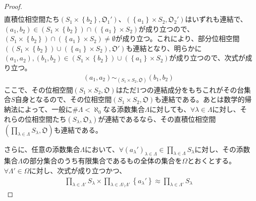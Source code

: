\documentclass[dvipdfmx]{jsarticle}
\begin{document}
\begin{proof}
\begin{align*}
\end{align*}
直積位相空間たち$\left( S_{1} \times \left\{ b_{2} \right\},\mathfrak{O}_{1}' \right)$、$\left( \left\{ a_{1} \right\} \times S_{2},\mathfrak{O}_{2}' \right)$はいずれも連結で、$\left( a_{1},b_{2} \right) \in \left( S_{1} \times \left\{ b_{2} \right\} \right) \cap \left( \left\{ a_{1} \right\} \times S_{2} \right)$が成り立つので、$\left( S_{1} \times \left\{ b_{2} \right\} \right) \cap \left( \left\{ a_{1} \right\} \times S_{2} \right) \neq \emptyset$が成り立つ。これにより、部分位相空間$\left( \left( S_{1} \times \left\{ b_{2} \right\} \right) \cup \left( \left\{ a_{1} \right\} \times S_{2} \right),\mathfrak{O}' \right)$も連結となり、明らかに$\left( a_{1},a_{2} \right),\left( b_{1},b_{2} \right) \in \left( S_{1} \times \left\{ b_{2} \right\} \right) \cup \left( \left\{ a_{1} \right\} \times S_{2} \right)$が成り立つので、次式が成り立つ。
\begin{align*}
\left( a_{1},a_{2} \right) \sim_{\left( S_{1} \times S_{2},\mathfrak{O} \right)}\left( b_{1},b_{2} \right)
\end{align*}
ここで、その位相空間$\left( S_{1} \times S_{2},\mathfrak{O} \right)$はただ1つの連結成分をもちこれがその台集合$S$自身となるので、その位相空間$\left( S_{1} \times S_{2},\mathfrak{O} \right)$も連結である。あとは数学的帰納法によって、一般に${\#}\varLambda < \aleph_{0}$なる添数集合$\varLambda$に対しても、$\forall\lambda \in \varLambda$に対し、それらの位相空間たち$\left( S_{\lambda},\mathfrak{O}_{\lambda} \right)$が連結であるなら、その直積位相空間$\left( \prod_{\lambda \in \varLambda} S_{\lambda},\mathfrak{O} \right)$も連結である。\par
さらに、任意の添数集合$\varLambda$において、$\forall\left( a_{\lambda}' \right)_{\lambda \in \varLambda} \in \prod_{\lambda \in \varLambda} S_{\lambda}$に対し、その添数集合$\varLambda$の部分集合のうち有限集合であるもの全体の集合を$\varOmega$とおくとする。$\forall\varLambda' \in \varOmega$に対し、次式が成り立つかつ、
\begin{align*}
\prod_{\lambda \in \varLambda'} S_{\lambda} \times \prod_{\lambda \in \varLambda \setminus \varLambda'} \left\{ a_{\lambda}' \right\} \approx \prod_{\lambda \in \varLambda'} S_{\lambda}
\end{align*}

\end{proof}
\end{document}
